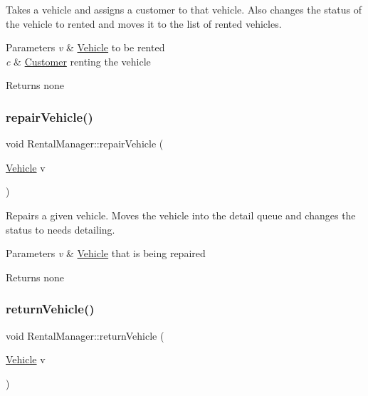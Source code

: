 Takes a vehicle and assigns a customer to that vehicle. Also changes the status of the vehicle to rented and moves it to the list of rented vehicles.


\begin{DoxyParams}{Parameters}
{\em v} & \hyperlink{class_vehicle}{Vehicle} to be rented \\
\hline
{\em c} & \hyperlink{class_customer}{Customer} renting the vehicle \\
\hline
\end{DoxyParams}
\begin{DoxyReturn}{Returns}
none 
\end{DoxyReturn}
\mbox{\label{class_rental_manager_a17e836a98a2d3b0c9296dd92c9f86d19}} 
\subsubsection{\texorpdfstring{repair\+Vehicle()}{repairVehicle()}}
{\footnotesize\ttfamily void Rental\+Manager\+::repair\+Vehicle (\begin{DoxyParamCaption}\item[{\hyperlink{class_vehicle}{Vehicle}}]{v }\end{DoxyParamCaption})}

Repairs a given vehicle. Moves the vehicle into the detail queue and changes the status to needs detailing.


\begin{DoxyParams}{Parameters}
{\em v} & \hyperlink{class_vehicle}{Vehicle} that is being repaired \\
\hline
\end{DoxyParams}
\begin{DoxyReturn}{Returns}
none 
\end{DoxyReturn}
\mbox{\label{class_rental_manager_a372dc4e901586e4e40e697df8c990faa}} 
\subsubsection{\texorpdfstring{return\+Vehicle()}{returnVehicle()}}
{\footnotesize\ttfamily void Rental\+Manager\+::return\+Vehicle (\begin{DoxyParamCaption}\item[{\hyperlink{class_vehicle}{Vehicle}}]{v }\end{DoxyParamCaption})}

